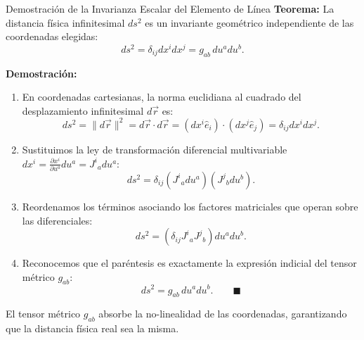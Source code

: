 \documentclass[10pt,aspectratio=169]{beamer}
\begin{document}
\begin{frame}{Demostración de la Invarianza Escalar del Elemento de Línea}
  \footnotesize
  \textbf{Teorema:} La distancia física infinitesimal $ds^2$ es un invariante geométrico independiente de las coordenadas elegidas:
  \[
  ds^2 = \delta_{ij} dx^i dx^j = g_{ab}\, du^a du^b.
  \]

  \vspace{0.2cm}
  \textbf{Demostración:}
  \begin{enumerate}\itemsep4pt
    \item En coordenadas cartesianas, la norma euclidiana al cuadrado del desplazamiento infinitesimal $d\vec{r}$ es:
    \[
    ds^2 = \|d\vec{r}\|^2 = d\vec{r} \cdot d\vec{r} = (dx^i \hat{e}_i) \cdot (dx^j \hat{e}_j) = \delta_{ij} dx^i dx^j.
    \]
    \item Sustituimos la ley de transformación diferencial multivariable $dx^i = \frac{\partial x^i}{\partial u^a} du^a = J^i{}_a du^a$:
    \[
    ds^2 = \delta_{ij} (J^i{}_a du^a)(J^j{}_b du^b).
    \]
    \item Reordenamos los términos asociando los factores matriciales que operan sobre las diferenciales:
    \[
    ds^2 = (\delta_{ij} J^i{}_a J^j{}_b) du^a du^b.
    \]
    \item Reconocemos que el paréntesis es exactamente la expresión indicial del tensor métrico $g_{ab}$:
    \[
    ds^2 = g_{ab}\, du^a du^b. \qquad \blacksquare
    \]
  \end{enumerate}
  El tensor métrico $g_{ab}$ absorbe la no-linealidad de las coordenadas, garantizando que la distancia física real sea la misma.
\end{frame}
\end{document}
